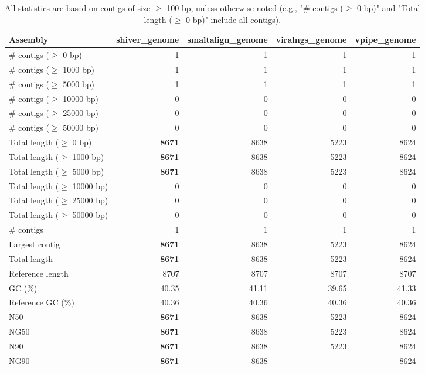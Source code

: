 \documentclass[12pt,a4paper]{article}
\begin{document}
\begin{table}[ht]
\begin{center}
\caption{All statistics are based on contigs of size $\geq$ 100 bp, unless otherwise noted (e.g., "\# contigs ($\geq$ 0 bp)" and "Total length ($\geq$ 0 bp)" include all contigs).}
\begin{tabular}{|l*{4}{|r}|}
\hline
Assembly & shiver\_genome & smaltalign\_genome & viralngs\_genome & vpipe\_genome \\ \hline
\# contigs ($\geq$ 0 bp) & 1 & 1 & 1 & 1 \\ \hline
\# contigs ($\geq$ 1000 bp) & 1 & 1 & 1 & 1 \\ \hline
\# contigs ($\geq$ 5000 bp) & 1 & 1 & 1 & 1 \\ \hline
\# contigs ($\geq$ 10000 bp) & 0 & 0 & 0 & 0 \\ \hline
\# contigs ($\geq$ 25000 bp) & 0 & 0 & 0 & 0 \\ \hline
\# contigs ($\geq$ 50000 bp) & 0 & 0 & 0 & 0 \\ \hline
Total length ($\geq$ 0 bp) & {\bf 8671} & 8638 & 5223 & 8624 \\ \hline
Total length ($\geq$ 1000 bp) & {\bf 8671} & 8638 & 5223 & 8624 \\ \hline
Total length ($\geq$ 5000 bp) & {\bf 8671} & 8638 & 5223 & 8624 \\ \hline
Total length ($\geq$ 10000 bp) & 0 & 0 & 0 & 0 \\ \hline
Total length ($\geq$ 25000 bp) & 0 & 0 & 0 & 0 \\ \hline
Total length ($\geq$ 50000 bp) & 0 & 0 & 0 & 0 \\ \hline
\# contigs & 1 & 1 & 1 & 1 \\ \hline
Largest contig & {\bf 8671} & 8638 & 5223 & 8624 \\ \hline
Total length & {\bf 8671} & 8638 & 5223 & 8624 \\ \hline
Reference length & 8707 & 8707 & 8707 & 8707 \\ \hline
GC (\%) & 40.35 & 41.11 & 39.65 & 41.33 \\ \hline
Reference GC (\%) & 40.36 & 40.36 & 40.36 & 40.36 \\ \hline
N50 & {\bf 8671} & 8638 & 5223 & 8624 \\ \hline
NG50 & {\bf 8671} & 8638 & 5223 & 8624 \\ \hline
N90 & {\bf 8671} & 8638 & 5223 & 8624 \\ \hline
NG90 & {\bf 8671} & 8638 & - & 8624 \\ \hline

\end{tabular}
\end{center}
\end{table}
\end{document}
